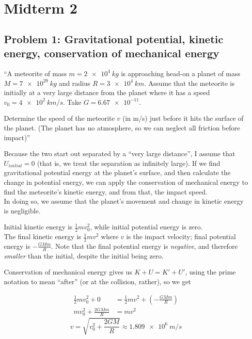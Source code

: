 \documentclass[8.01x]{subfiles}
\begin{document}
\chapter{Midterm 2}

\section{Problem 1: Gravitational potential, kinetic energy, conservation of mechanical energy}

``A meteorite of mass $m = \SI{2e4}{kg}$ is approaching head-on a planet of mass $M = \SI{7e29}{kg}$ and radius $R = \SI{3e4}{km}$. Assume that the meteorite is initially at a very large distance from the planet where it has a speed $v_0 = \SI{4e2}{km/s}$. Take $G = \num{6.67e-11}$.

Determine the speed of the meteorite $v$ (in m/s) just before it hits the surface of the planet. (The planet has no atmosphere, so we can neglect all friction before impact)''

Because the two start out separated by a ``very large distance'', I assume that $U_{initial} = 0$ (that is, we treat the separation as infinitely large). If we find gravitational potential energy at the planet's surface, and then calculate the change in potential energy, we can apply the conservation of mechanical energy to find the meteorite's kinetic energy, and from that, the impact speed.\\
In doing so, we assume that the planet's movement and change in kinetic energy is negligible.

Initial kinetic energy is $\displaystyle \frac{1}{2} m v_0^2$, while initial potential energy is zero.\\
The final kinetic energy is $\displaystyle \frac{1}{2} m v^2$ where $v$ is the impact velocity; final potential energy is $\displaystyle - \frac{G M m}{R}$. Note that the final potential energy is \emph{negative}, and therefore \emph{smaller} than the initial, despite the initial being zero.

Conservation of mechanical energy gives us $K + U = K' + U'$, using the prime notation to mean ``after'' (or at the collision, rather), so we get

\begin{align}
\frac{1}{2} m v_0^2 + 0 &= \frac{1}{2} m v^2 + \left( - \frac{G M m}{R} \right)\\
m v_0^2 + \frac{2 G M m}{R} &= m v^2
\end{align}
\begin{equation}
v = \sqrt{v_0^2 + \frac{2 G M}{R}} \approx \SI{1.809e6}{m/s}
\end{equation}
\end{document}
